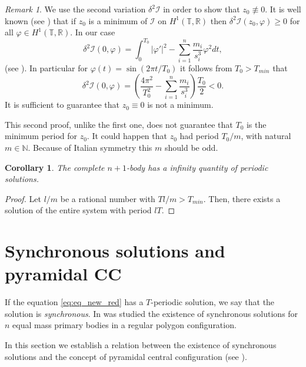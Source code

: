 \documentclass[twoside]{article}
\newtheorem{cor}[thm]{Corollary}
\theoremstyle{remark}
\newtheorem{comentario}{Remark}
\newcommand{\rr}{\mathbb{R}}
\begin{document}
\begin{comentario}
We use the second variation $\delta^2 \mathcal{I}$ in order to show  that $z_0\nequiv 0$. It is well known (see \cite[Th. 1.3.1]{jost1998calculus}) that if $z_0$ is a minimum of $\mathcal{I}$ on $H^1(\mathbb{T},\rr)$  then $\delta^2 \mathcal{I} (z_0,\varphi)\geq 0$ for all $\varphi\in H^1(\mathbb{T},\rr)$. In our case
\[\delta^2\mathcal{I}(0,\varphi)=\int_0^{T_0} |\varphi'|^2-\sum_{i=1}^{n}\frac{m_i}{s_i^3}\varphi^2 dt,\]
(see \cite[Eq. 1.3.6]{jost1998calculus}). In particular for $\varphi(t)=\sin (2\pi t/T_0)$ it follows from $T_0>T_{min}$  that
\begin{equation}\label{eq:form.delta2}
 \delta^2 \mathcal{I} (0,\varphi)=\left( \frac{4\pi^2}{T_0^2}-\sum_{i=1}^{n}\frac{m_i}{s_i^3} \right)\frac{T_0}{2}<0.
\end{equation}
It is sufficient  to guarantee that $z_0\equiv 0$ is not a minimum.


This second proof, unlike the first one, does not guarantee that $T_0$ is the minimum period for $z_0$. It could happen that $z_0$ had period $T_0/m$, with natural $m\in\mathbb{N}$. Because of Italian symmetry this $m$ should be odd.
\end{comentario}






\begin{cor}\label{cor:sol.periodica.sist.completo}
The complete $n+1$-body has a infinity quantity of periodic solutions.
\end{cor}
\begin{proof}
Let $l/m$  be a rational number with $Tl/m>T_{min}$. Then, there exists a solution of the entire system with period $lT$.
\end{proof}





\section{Synchronous solutions and pyramidal CC}\label{sec:sincro}



If the equation \eqref{eq:eq_new_red} has a $T$-periodic solution,  we say that the solution is \emph{synchronous}. In \cite{li2013characterization} was studied the existence of synchronous solutions for $n$ equal mass primary bodies in a regular polygon configuration.

In this section we establish a relation between the existence of synchronous solutions and the concept of pyramidal central configuration (see \cite{fayccal1996classification,faycaltesis,ouyang2004pyramidal}).
\end{document}
